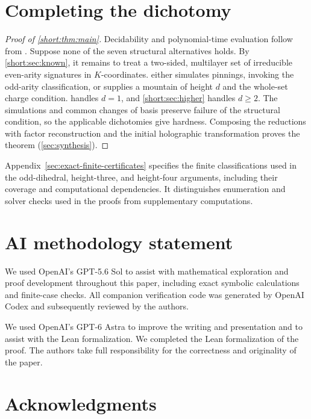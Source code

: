 \documentclass[11pt,letterpaper,onecolumn]{article}
\theoremstyle{plain}
\theoremstyle{definition}
\theoremstyle{remark}
\begin{document}
\section{Completing the dichotomy}
\label{short:sec:completion}

\begin{proof}[Proof of \cref{short:thm:main}]
Decidability and polynomial-time evaluation follow from
\cite[Theorem~2.22]{Liu2026DEQ2Holant}. Suppose none of the seven
structural alternatives holds. By \cref{short:sec:known}, it remains to
treat a two-sided, multilayer set of irreducible even-arity signatures
in \(K\)-coordinates.  either simulates
pinnings, invoking the odd-arity classification, or supplies a mountain
of height \(d\) and the whole-set charge condition.
 handles \(d=1\), and
\cref{short:sec:higher} handles \(d\ge2\). The simulations and common
changes of basis preserve failure of the structural condition, so the
applicable dichotomies give hardness. Composing the reductions with
factor reconstruction and the initial holographic transformation proves
the theorem (\cref{sec:synthesis}).
\end{proof}

Appendix~\ref{sec:exact-finite-certificates} specifies the finite classifications used
in the odd-dihedral, height-three, and height-four arguments, including
their coverage and computational dependencies. It distinguishes
enumeration and solver checks used in the proofs from supplementary
computations.

\section*{AI methodology statement}

We used OpenAI's GPT-5.6 Sol to assist with mathematical exploration and
proof development throughout this paper, including exact symbolic
calculations and finite-case checks. All companion verification code was
generated by OpenAI Codex and subsequently reviewed by the authors.

We used OpenAI's GPT-6 Astra to improve the writing and presentation and
to assist with the Lean formalization. We completed the Lean formalization
of the proof. The authors take full responsibility for the correctness
and originality of the paper.

\section*{Acknowledgments}
\end{document}
